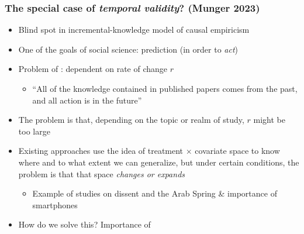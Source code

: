 \documentclass[aspectratio=43]{beamer}
\begin{document}

\begin{frame}
\frametitle{The special case of \textit{temporal validity}? (Munger 2023)}
\centering

\begin{itemize}
  \item Blind spot in incremental-knowledge model of causal empiricism
  \item<2-> One of the goals of social science: prediction (in order to \textit{act})
  \item<3-> Problem of : dependent on rate of change $r$
  \begin{itemize}
    \item ``All of the knowledge contained in published papers comes from the past, and all action is in the future''
  \end{itemize}
  \item<4-> The problem is that, depending on the topic or realm of study, $r$ might be too large
  \item<5-> Existing approaches use the idea of treatment $\times$ covariate space to know where and to what extent we can generalize, but under certain conditions, the problem is that that space \textit{changes or expands}
  \begin{itemize}
    \item Example of studies on dissent and the Arab Spring \& importance of smartphones
  \end{itemize}
  \item<6-> How do we solve this? Importance of 
\end{itemize}

\end{frame}
\end{document}
